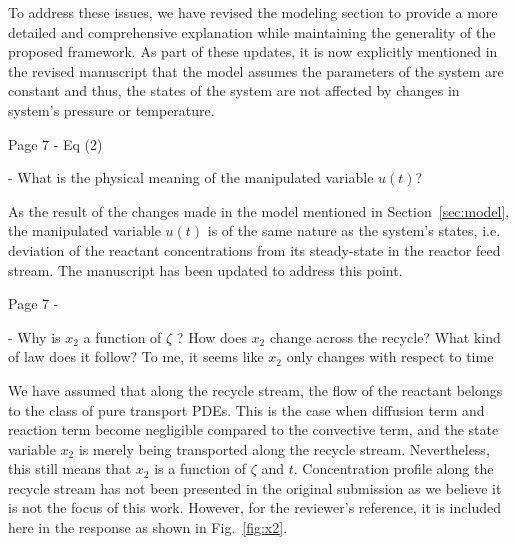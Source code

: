 \documentclass[12pt,answers]{exam}
\begin{document}
\begin{questions}
\begin{solutionorbox}
        To address these issues, we have revised the modeling section to provide a more detailed and comprehensive explanation while maintaining the generality of the proposed framework. As part of these updates, it is now explicitly mentioned in the revised manuscript that the model assumes the parameters of the system are constant and thus, the states of the system are not affected by changes in system's pressure or temperature.
    \end{solutionorbox}


    \question Page 7 - Eq (2)

    - What is the physical meaning of the manipulated variable $u(t)$?

    \begin{solutionorbox} \label{comment:1_5}
        As the result of the changes made in the model mentioned in Section~\ref{sec:model}, the manipulated variable $u(t)$ is of the same nature as the system's states, i.e. deviation of the reactant concentrations from its steady-state in the reactor feed stream. The manuscript has been updated to address this point.
    \end{solutionorbox}


    \question Page 7 - 

    - Why is $x_2$ a function of $\zeta$ ? How does $x_2$ change across the recycle? What kind of law does it follow? To me, it seems like $x_2$ only changes with respect to time

    \begin{solutionorbox} \label{comment:1_6}
        We have assumed that along the recycle stream, the flow of the reactant belongs to the class of pure transport PDEs. This is the case when diffusion term and reaction term become negligible compared to the convective term, and the state variable $x_2$ is merely being transported along the recycle stream. Nevertheless, this still means that $x_2$ is a function of $\zeta$ and $t$. Concentration profile along the recycle stream has not been presented in the original submission as we believe it is not the focus of this work. However, for the reviewer's reference, it is included here in the response as shown in Fig.~\ref{fig:x2}.
    \end{solutionorbox}


\end{questions}
\end{document}
